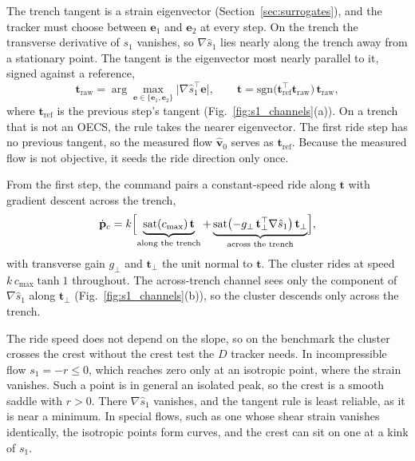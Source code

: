 \documentclass[lettersize,journal]{IEEEtran}
\begin{document}
The trench tangent is a strain eigenvector (Section~\ref{sec:surrogates}),
and the tracker must choose between $\mathbf{e}_1$ and $\mathbf{e}_2$ at
every step. On the trench the transverse derivative of $s_1$ vanishes, so
$\nabla\hat{s}_1$ lies nearly along the trench away from a stationary
point. The tangent is the eigenvector most nearly parallel to it, signed
against a reference,
\begin{equation}
    \mathbf{t}_{\mathrm{raw}} =
    \arg\max_{\mathbf{e} \in \{\mathbf{e}_1, \mathbf{e}_2\}}
    \bigl\lvert \nabla\hat{s}_1^\top \mathbf{e} \bigr\rvert,
    \qquad
    \mathbf{t} = \mathrm{sgn}\bigl(\mathbf{t}_{\mathrm{ref}}^\top
    \mathbf{t}_{\mathrm{raw}}\bigr)\,\mathbf{t}_{\mathrm{raw}},
    \label{eq:tangent_select}
\end{equation}
where $\mathbf{t}_{\mathrm{ref}}$ is the previous step's tangent
(Fig.~\ref{fig:s1_channels}(a)). On a trench that is not an OECS, the
rule takes the nearer eigenvector. The first ride step has no previous
tangent, so the measured flow $\hat{\mathbf{v}}_0$ serves as
$\mathbf{t}_{\mathrm{ref}}$. Because the measured flow is not objective,
it seeds the ride direction only once.

From the first step, the command pairs a constant-speed ride along
$\mathbf{t}$ with gradient descent across the trench,
\begin{equation}
    \dot{\mathbf{p}}_c = k\Bigl[
    \underbrace{\mathrm{sat}(c_{\max})\,\mathbf{t}}_{\text{along the trench}}
    + \underbrace{\mathrm{sat}\bigl(-g_\perp\,\mathbf{t}_\perp^\top
      \nabla\hat{s}_1\bigr)\,\mathbf{t}_\perp}_{\text{across the trench}}\Bigr],
    \label{eq:s1_law}
\end{equation}
with transverse gain $g_\perp$ and $\mathbf{t}_\perp$ the unit normal to
$\mathbf{t}$. The cluster rides at speed $k\,c_{\max}\tanh 1$ throughout.
The across-trench channel sees only the component of $\nabla\hat{s}_1$
along $\mathbf{t}_\perp$ (Fig.~\ref{fig:s1_channels}(b)), so the cluster
descends only across the trench.

The ride speed does not depend on the slope, so on the benchmark the
cluster crosses the crest without the crest test the $D$ tracker needs. In incompressible
flow $s_1 = -r \leq 0$, which reaches zero only at an isotropic point,
where the strain vanishes. Such a point is in general an isolated peak,
so the crest is a smooth saddle with $r > 0$. There $\nabla\hat{s}_1$
vanishes, and the tangent rule is least reliable, as it is near a
minimum. In special flows, such as one whose shear strain vanishes
identically, the isotropic points form curves, and the crest can sit on
one at a kink of $s_1$.
\end{document}
